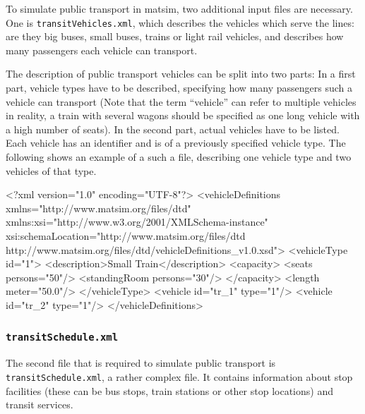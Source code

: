 

To simulate public transport in \gls{matsim}, two additional input files are necessary. One is \lstinline|transitVehicles.xml|, which describes the vehicles which serve the lines: are they big buses, small buses, trains or light rail vehicles, and describes how many passengers each vehicle can transport.

The description of public transport vehicles can be split into two parts: In a first part, vehicle types have to be described, specifying how many passengers such a vehicle can transport (Note that the term ``vehicle'' can refer to multiple vehicles in reality, \eg a train with several wagons should be specified as one long vehicle with a high number of seats). In the second part, actual vehicles have to be listed. Each vehicle has an identifier and is of a previously specified vehicle type. The following shows an example of a such a file, describing one vehicle type and two vehicles of that type. 

\begin{xml}
<?xml version="1.0" encoding="UTF-8"?> 
<vehicleDefinitions xmlns="http://www.matsim.org/files/dtd" 
       xmlns:xsi="http://www.w3.org/2001/XMLSchema-instance" 
       xsi:schemaLocation="http://www.matsim.org/files/dtd http://www.matsim.org/files/dtd/vehicleDefinitions_v1.0.xsd"> 
	<vehicleType id="1"> 
      <description>Small Train</description> 
      <capacity> 
         <seats persons="50"/> 
         <standingRoom persons="30"/> 
      </capacity> 
      <length meter="50.0"/> 
   </vehicleType> 
   <vehicle id="tr_1" type="1"/> 
   <vehicle id="tr_2" type="1"/> 
</vehicleDefinitions>
\end{xml}

\subsubsection{\lstinline|transitSchedule.xml|}
\label{sec:inputdata:transitschedule}
The second file that is required to simulate public transport is \lstinline|transitSchedule.xml|, a rather complex file. It contains information about stop facilities (these can be bus stops, train stations or other stop locations) and transit services.

